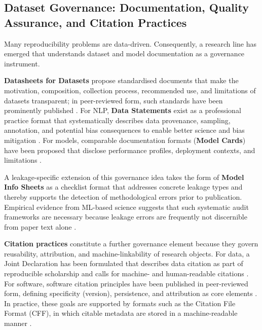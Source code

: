 \documentclass[12pt, a4paper]{article}
\begin{document}
\subsection{Dataset Governance: Documentation, Quality Assurance, and
            Citation Practices}
\label{sec:governance}

Many reproducibility problems are data-driven.  Consequently, a research
line has emerged that understands dataset and model documentation as a
governance instrument.

\textbf{Datasheets for Datasets} propose standardised documents that
make the motivation, composition, collection process, recommended use,
and limitations of datasets transparent; in peer-reviewed form, such
standards have been prominently published \cite{Gebru2021}.  For NLP,
\textbf{Data Statements} exist as a professional practice format that
systematically describes data provenance, sampling, annotation, and
potential bias consequences to enable better science and bias mitigation
\cite{Bender2018}.  For models, comparable documentation formats
(\textbf{Model Cards}) have been proposed that disclose performance
profiles, deployment contexts, and limitations \cite{Mitchell2019}.

A leakage-specific extension of this governance idea takes the form of
\textbf{Model Info Sheets} as a checklist format that addresses concrete
leakage types and thereby supports the detection of methodological
errors prior to publication.  Empirical evidence from ML-based science
suggests that such systematic audit frameworks are necessary because
leakage errors are frequently not discernible from paper text alone
\cite{Kapoor2023}.

\textbf{Citation practices} constitute a further governance element
because they govern reusability, attribution, and machine-linkability of
research objects.  For data, a Joint Declaration has been formulated
that describes data citation as part of reproducible scholarship and
calls for machine- and human-readable citations \cite{FORCE11_2014}.
For software, software citation principles have been published in
peer-reviewed form, defining specificity (version), persistence, and
attribution as core elements \cite{Smith2016}.  In practice, these goals
are supported by formats such as the Citation File Format (CFF), in
which citable metadata are stored in a machine-readable manner
\cite{Druskat2021}.
\end{document}
